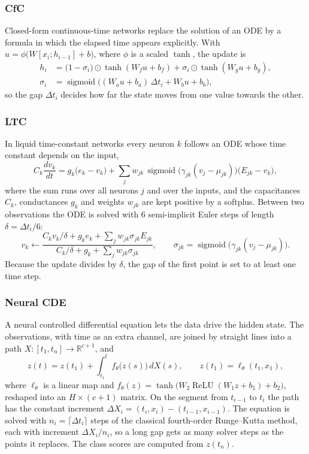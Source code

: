\subsubsection*{CfC}
Closed-form continuous-time networks \cite{hasani2022cfc} replace the
solution of an ODE by a formula in which the elapsed time appears
explicitly. With $u = \phi\bigl(W[x_i; h_{i-1}] + b\bigr)$, where $\phi$
is a scaled $\tanh$, the update is
\begin{align*}
  h_i &= \bigl(1 - \sigma_i\bigr) \odot \tanh(W_f u + b_f)
      + \sigma_i \odot \tanh(W_g u + b_g), \\
  \sigma_i &= \operatorname{sigmoid}\bigl((W_a u + b_a)\,\Delta t_i
      + W_b u + b_b\bigr),
\end{align*}
so the gap $\Delta t_i$ decides how far the state moves from one value
towards the other.

\subsubsection*{LTC}
In liquid time-constant networks \cite{hasani2021ltc} every neuron $k$
follows an ODE whose time constant depends on the input,
\[
  C_k \frac{dv_k}{dt} = g_k\bigl(e_k - v_k\bigr)
  + \sum_j w_{jk}\, \operatorname{sigmoid}\bigl(\gamma_{jk}(v_j - \mu_{jk})\bigr)
    \bigl(E_{jk} - v_k\bigr),
\]
where the sum runs over all neurons $j$ and over the inputs, and the
capacitances $C_k$, conductances $g_k$ and weights $w_{jk}$ are kept
positive by a softplus. Between two observations the ODE is solved with
$6$ semi-implicit Euler steps of length $\delta = \Delta t_i / 6$:
\[
  v_k \leftarrow
  \frac{C_k v_k / \delta + g_k e_k + \sum_j w_{jk} \sigma_{jk} E_{jk}}
       {C_k / \delta + g_k + \sum_j w_{jk} \sigma_{jk}},
  \qquad
  \sigma_{jk} = \operatorname{sigmoid}\bigl(\gamma_{jk}(v_j - \mu_{jk})\bigr).
\]
Because the update divides by $\delta$, the gap of the first point is set
to at least one time step.

\subsubsection*{Neural CDE}
A neural controlled differential equation \cite{kidger2020ncde} lets the
data drive the hidden state. The observations, with time as an extra
channel, are joined by straight lines into a path
$X \colon [t_1, t_n] \to \mathbb{R}^{c+1}$, and
\[
  z(t) = z(t_1) + \int_{t_1}^{t} f_\theta\bigl(z(s)\bigr)\, dX(s),
  \qquad
  z(t_1) = \ell_\theta(t_1, x_1),
\]
where $\ell_\theta$ is a linear map and
$f_\theta(z) = \tanh\bigl(W_2 \operatorname{ReLU}(W_1 z + b_1) + b_2\bigr)$,
reshaped into an $H \times (c+1)$ matrix. On the segment from $t_{i-1}$ to
$t_i$ the path has the constant increment
$\Delta X_i = (t_i, x_i) - (t_{i-1}, x_{i-1})$. The equation is solved
with $n_i = \lceil \Delta t_i \rceil$ steps of the classical fourth-order
Runge--Kutta method, each with increment $\Delta X_i / n_i$, so a long gap
gets as many solver steps as the points it replaces. The class scores are
computed from $z(t_n)$.

